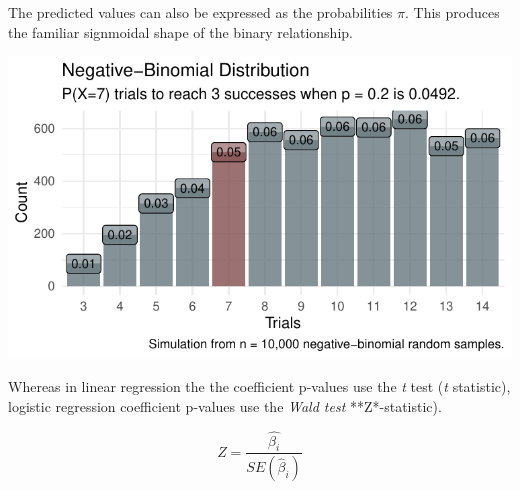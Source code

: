 \documentclass[
]{book}
\newenvironment{Shaded}{\begin{snugshade}}{\end{snugshade}}
\newcommand{\DataTypeTok}[1]{\textcolor[rgb]{0.13,0.29,0.53}{#1}}
\newcommand{\DecValTok}[1]{\textcolor[rgb]{0.00,0.00,0.81}{#1}}
\newcommand{\KeywordTok}[1]{\textcolor[rgb]{0.13,0.29,0.53}{\textbf{#1}}}
\newcommand{\NormalTok}[1]{#1}
\newcommand{\OperatorTok}[1]{\textcolor[rgb]{0.81,0.36,0.00}{\textbf{#1}}}
\newcommand{\StringTok}[1]{\textcolor[rgb]{0.31,0.60,0.02}{#1}}
\begin{document}
The predicted values can also be expressed as the probabilities \(\pi\). This produces the familiar signmoidal shape of the binary relationship.

\begin{Shaded}
\end{Shaded}

\includegraphics{data-sci_files/figure-latex/unnamed-chunk-10-1.pdf}

Whereas in linear regression the the coefficient p-values use the \emph{t} test (\emph{t} statistic), logistic regression coefficient p-values use the \emph{Wald test} **Z*-statistic).

\[Z = \frac{\hat{\beta_i}}{SE(\hat{\beta}_i)}\]

\begin{Shaded}
\end{Shaded}
\end{document}
